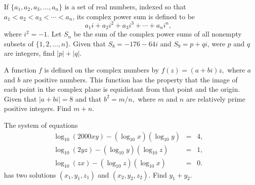 \documentclass[11pt]{article}
\theoremstyle{definition}
\begin{document}
\begin{question}[name={1998 AIME, \href{https://artofproblemsolving.com/community/c4p392484}{Problem 13}}]
	If $\{a_1,a_2,a_3,\ldots,a_n\}$ is a set of real numbers, indexed so that $a_1<a_2<a_3<\cdots<a_n$, its complex power sum is defined to be $$a_1i+a_2i^2+a_3i^3+\cdots+a_ni^n,$$ where $i^2=-1$. Let $S_n$ be the sum of the complex power sums of all nonempty subsets of $\{1,2,\ldots,n\}$. Given that $S_8=-176-64i$ and $S_9=p+qi$, were $p$ and $q$ are integers, find $|p|+|q|$.
\end{question}


%	













\begin{question}[name={1999 AIME, \href{https://artofproblemsolving.com/community/c4p392227}{Problem 9}}]
	A function $f$ is defined on the complex numbers by $f(z)=(a+bi)z,$ where $a$ and $b$ are positive numbers. This function has the property that the image of each point in the complex plane is equidistant from that point and the origin. Given that $|a+bi|=8$ and that $b^2=m/n,$ where $m$ and $n$ are relatively prime positive integers. Find $m+n.$	
	
\end{question}


%	












\begin{question}[name={2000 AIME I, \href{https://artofproblemsolving.com/community/c4p721503}{Problem 9}}]
	The system of equations
	\begin{eqnarray*}\log_{10}(2000xy) - (\log_{10}x)(\log_{10}y) & = & 4, \\
		\log_{10}(2yz) - (\log_{10}y)(\log_{10}z) & = & 1, \\
		\log_{10}(zx) - (\log_{10}z)(\log_{10}x) & = & 0.
	\end{eqnarray*}
	has two solutions $ (x_{1},y_{1},z_{1})$ and $ (x_{2},y_{2},z_{2}).$ Find $ y_{1} + y_{2}.$
\end{question}
\end{document}
